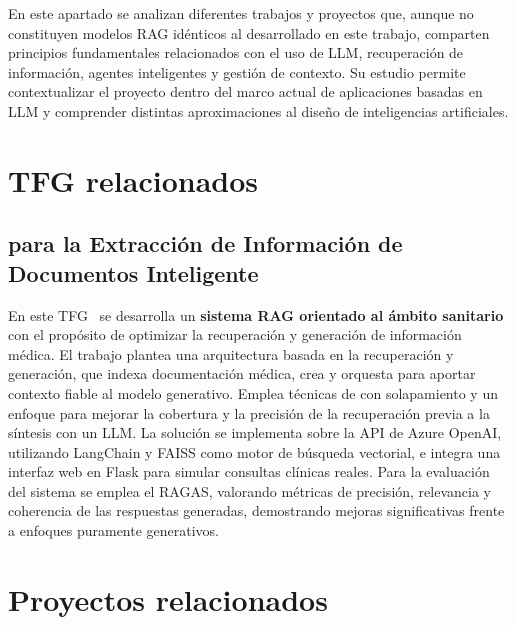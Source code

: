 
En este apartado se analizan diferentes trabajos y proyectos que, aunque no constituyen modelos RAG idénticos al desarrollado en este trabajo, comparten principios fundamentales relacionados con el uso de LLM, recuperación de información, agentes inteligentes y gestión de contexto. Su estudio permite contextualizar el proyecto dentro del marco actual de aplicaciones basadas en LLM y comprender distintas aproximaciones al diseño de inteligencias artificiales.

\section{TFG relacionados}
\subsection{ para la Extracción de Información de Documentos Inteligente}
En este TFG~\cite{trabajorelacionado:Daniel} se desarrolla un \textbf{sistema RAG orientado al ámbito sanitario} con el propósito de optimizar la recuperación y generación de información médica. El trabajo plantea una arquitectura basada en la recuperación y generación, que indexa documentación médica, crea  y orquesta  para aportar contexto fiable al modelo generativo. Emplea técnicas de  con solapamiento y un enfoque  para mejorar la cobertura y la precisión de la recuperación previa a la síntesis con un LLM. La solución se implementa sobre la API de Azure OpenAI, utilizando LangChain y FAISS como motor de búsqueda vectorial, e integra una interfaz web en Flask para simular consultas clínicas reales. Para la evaluación del sistema se emplea el  RAGAS, valorando métricas de precisión, relevancia y coherencia de las respuestas generadas, demostrando mejoras significativas frente a enfoques puramente generativos. 

\section{Proyectos relacionados}
